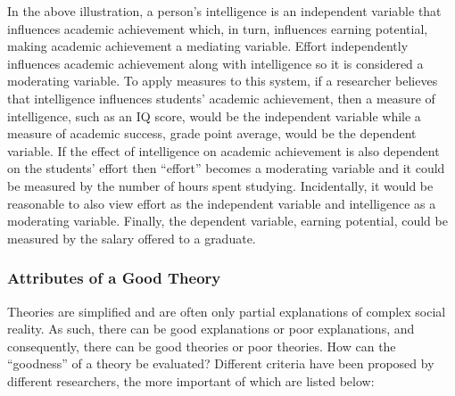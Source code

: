 In the above illustration, a person's intelligence is an independent variable that influences academic achievement which, in turn, influences earning potential, making academic achievement a mediating variable. Effort independently influences academic achievement along with intelligence so it is considered a moderating variable. To apply measures to this system, if a researcher believes that intelligence influences students' academic achievement, then a measure of intelligence, such as an IQ score, would be the independent variable while a measure of academic success, grade point average, would be the dependent variable. If the effect of intelligence on academic achievement is also dependent on the students' effort then ``effort'' becomes a moderating variable and it could be measured by the number of hours spent studying. Incidentally, it would be reasonable to also view effort as the independent variable and intelligence as a moderating variable. Finally, the dependent variable, earning potential, could be measured by the salary offered to a graduate.

\subsubsection{Attributes of a Good Theory}

Theories are simplified and are often only partial explanations of complex social reality. As such, there can be good explanations or poor explanations, and consequently, there can be good theories or poor theories. How can the ``goodness'' of a theory be evaluated? Different criteria have been proposed by different researchers, the more important of which are listed below:

